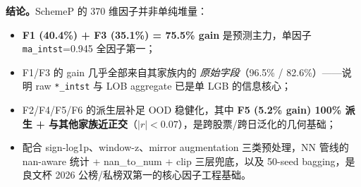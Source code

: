 \documentclass[10.5pt,a4paper]{article}
\begin{document}
\textbf{结论。}SchemeP 的 370 维因子并非单纯堆量：
\begin{itemize}[leftmargin=2em,itemsep=1pt,topsep=2pt]
  \item \textbf{F1 (40.4\%) + F3 (35.1\%) = 75.5\% gain} 是预测主力，单因子 \texttt{ma\_intst}=0.945 全因子第一；
  \item F1/F3 的 gain 几乎全部来自其家族内的 \emph{原始字段}（96.5\% / 82.6\%）——说明 raw \texttt{*\_intst} 与 LOB aggregate 已是单 LGB 的信息核心；
  \item F2/F4/F5/F6 的派生层补足 OOD 稳健化，其中 \textbf{F5 (5.2\% gain) 100\% 派生 + 与其他家族近正交}（$|r|<0.07$），是跨股票/跨日泛化的几何基础；
  \item 配合 sign-log1p、window-z、mirror augmentation 三类预处理，NN 管线的 nan-aware 统计 + nan\_to\_num + clip 三层兜底，以及 50-seed bagging，是良文杯 2026 公榜/私榜双第一的核心因子工程基础。
\end{itemize}
\end{document}
